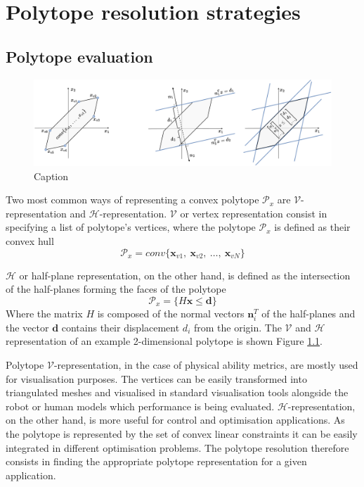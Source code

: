 
\chapter{Polytope resolution strategies} %

\label{ch:polytope_algorithms} %

\section{Polytope evaluation}

\begin{figure}[!htb]
    \centering
    \includegraphics[width=\linewidth]{Chapters/imgs/h_v_rep.pdf}
    \caption{Caption}
    \label{fig:hv_rep}
\end{figure}

Two most common ways of representing a convex polytope $\mathcal{P}_x$ are $\mathcal{V}$-representation and $\mathcal{H}$-representation. $\mathcal{V}$ or vertex representation consist in specifying a list of polytope's vertices, where the polytope $\mathcal{P}_x$ is defined as their convex hull 
\begin{equation}
    \mathcal{P}_x = conv\{ \bm{x}_{v1},~\bm{x}_{v2},~ \ldots , ~\bm{x}_{vN} \}
\end{equation} 

$\mathcal{H}$ or half-plane representation, on the other hand, is defined as the intersection of the half-planes forming the faces of the polytope
\begin{equation}
    \mathcal{P}_x = \{ H\bm{x} \leq \bm{d} \}
\end{equation} 
Where the matrix $H$ is composed of the normal vectors $\bm{n}_i^T$ of the half-planes and the vector $\bm{d}$ contains their displacement $d_i$ from the origin. The $\mathcal{V}$ and $\mathcal{H}$ representation of an example 2-dimensional polytope is shown Figure \ref{fig:hv_rep}. 

Polytope $\mathcal{V}$-representation, in the case of physical ability metrics, are mostly used for visualisation purposes. The vertices can be easily transformed into triangulated meshes and visualised in standard visualisation tools alongside the robot or human models which performance is being evaluated.  $\mathcal{H}$-representation, on the other hand, is more useful for control and optimisation applications. As the polytope is represented by the set of convex linear constraints it can be easily integrated in different optimisation problems. The polytope resolution therefore consists in finding the appropriate polytope representation for a given application. 

